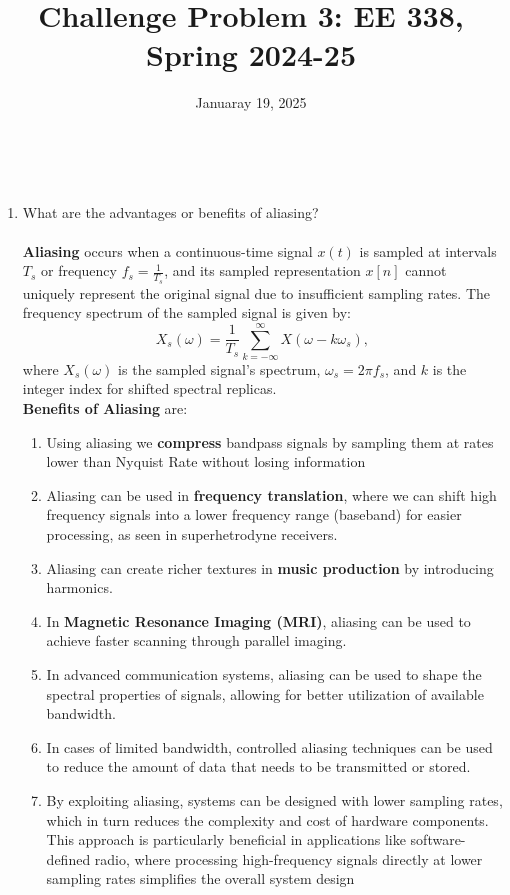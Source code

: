 \documentclass{article}
\title{Challenge Problem 3: EE 338, Spring 2024-25}
\author{
\IEEEauthorblockN{
    \begin{tabular}{cccc}
        \begin{minipage}[t]{0.23\textwidth}
            \centering
            Anupam Rawat\\
            IIT Bombay\\
            22b3982@iitb.ac.in
        \end{minipage} & 
        \begin{minipage}[t]{0.23\textwidth}
            \centering
            Jatin Kumar\\
            IIT Bombay\\
            22b3922@iitb.ac.in
        \end{minipage} & 
        \begin{minipage}[t]{0.23\textwidth}
            \centering
            Rishabh Bhardwaj\\
            IIT Bombay\\
            22b3962@iitb.ac.in
        \end{minipage}\\
        \\ 
    \end{tabular}
}
}
\date{Januaray 19, 2025}
\begin{document}
\maketitle

\\

\begin{enumerate}
    \item What are the advantages or benefits of aliasing?
    \\
    \\
    \textbf{Aliasing} occurs when a continuous-time signal \(x(t)\) is sampled at intervals \(T_s\) or frequency \(f_s = \frac{1}{T_s}\), and its sampled representation \(x[n]\) cannot uniquely represent the original signal due to insufficient sampling rates. The frequency spectrum of the sampled signal is given by:
        \[
        X_s(\omega) = \frac{1}{T_s} \sum_{k=-\infty}^\infty X\left(\omega - k\omega_s\right),
        \]
        where \(X_s(\omega)\) is the sampled signal's spectrum, \(\omega_s = 2\pi f_s\), and \(k\) is the integer index for shifted spectral replicas. \\
    \textbf{Benefits of Aliasing} are:
    \begin{enumerate}
        \item Using aliasing we \textbf{compress} bandpass signals by sampling them at rates lower than Nyquist Rate without losing information
        \item Aliasing can be used in \textbf{frequency translation}, where we can shift high frequency signals into a lower frequency range (baseband) for easier processing, as seen in superhetrodyne receivers.
        \item Aliasing can create richer textures in \textbf{music production} by introducing harmonics.
        \item In \textbf{Magnetic Resonance Imaging (MRI)}, aliasing can be used to achieve faster scanning through parallel imaging.
        \item  In advanced communication systems, aliasing can be used to shape the spectral properties of signals, allowing for better utilization of available bandwidth.
        \item In cases of limited bandwidth, controlled aliasing techniques can be used to reduce the amount of data that needs to be transmitted or stored.
        \item By exploiting aliasing, systems can be designed with lower sampling rates, which in turn reduces the complexity and cost of hardware components. This approach is particularly beneficial in applications like software-defined radio, where processing high-frequency signals directly at lower sampling rates simplifies the overall system design
    \end{enumerate}
    
\end{enumerate}
\end{document}
